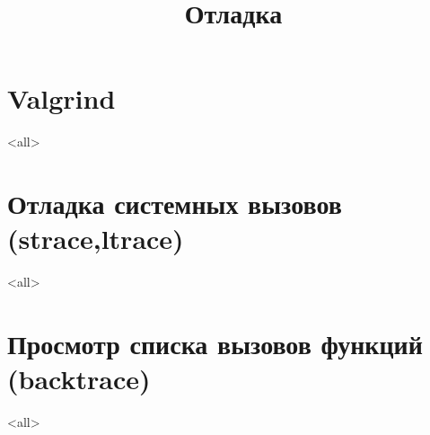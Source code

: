 

\title[Отладка]{Отладка}





\begin{frame}
	\frametitle{}
	\titlepage
	\vspace{-0.5cm}
	\begin{center}
	\end{center}
\end{frame}

\begin{frame}
	\tableofcontents
\end{frame}




\section{Valgrind}
\mode<all>{}

\section{Отладка системных вызовов (strace,ltrace)}
\mode<all>{}

\section{Просмотр списка вызовов функций (backtrace)}
\mode<all>{}


